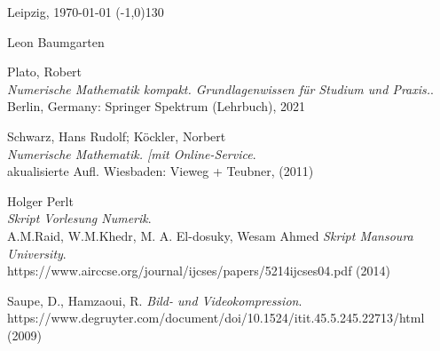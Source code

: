 \documentclass[12pt]{article}
\begin{document}
		Leipzig, \today \hspace{6cm} \line(-1,0){130}
		\begin{center}
			\hspace{36mm} {\footnotesize Leon Baumgarten}
		\end{center}
		
		\newpage
		\begin{thebibliography}{99} %
			Plato, Robert \\
			\emph{Numerische Mathematik kompakt. Grundlagenwissen für Studium und Praxis.}. \\
			Berlin, Germany: Springer Spektrum (Lehrbuch), 2021
			
			Schwarz, Hans Rudolf; Köckler, Norbert  \\
			\emph{ Numerische Mathematik. [mit Online-Service}. \\
			akualisierte Aufl. Wiesbaden: Vieweg + Teubner, (2011)
			
			Holger Perlt \\
			\emph{Skript Vorlesung Numerik}. \\
			
			A.M.Raid, W.M.Khedr, M. A. El-dosuky, Wesam Ahmed
			\emph{Skript Mansoura University}. \\
			https://www.airccse.org/journal/ijcses/papers/5214ijcses04.pdf (2014)
			
			
			Saupe, D., Hamzaoui, R. 
			\emph{Bild- und Videokompression}. \\
			https://www.degruyter.com/document/doi/10.1524/itit.45.5.245.22713/html (2009)
			
		\end{thebibliography}
				\newpage
	
	
\end{document}
